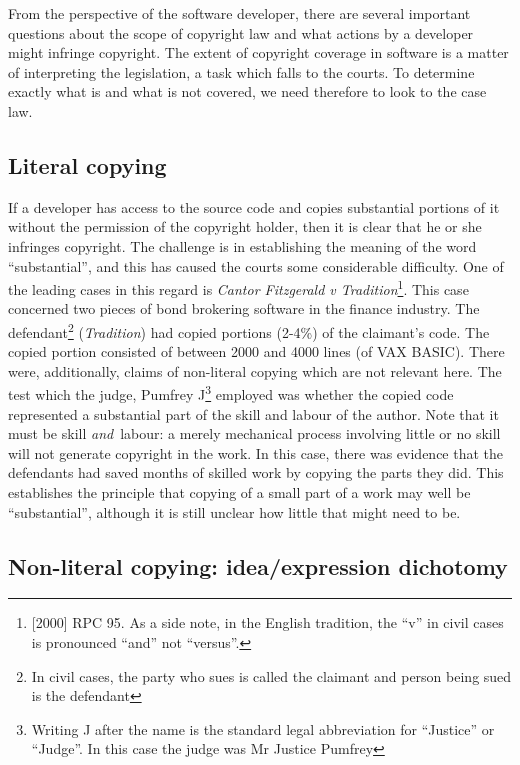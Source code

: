 \documentclass[a4paper,12pt]{article}
\begin{document}
From the perspective of the software developer, there are several important
questions about the scope of copyright law and what actions by a developer
might infringe copyright. The extent of copyright coverage in software is a
matter of interpreting the legislation, a task which falls to the courts. To
determine exactly what is and what is not covered, we need therefore to look
to the case law.

\subsection{Literal copying}

If a developer has access to the source code and copies substantial portions
of it without the permission of the copyright holder, then it is clear that
he or she infringes copyright. The challenge is in establishing the meaning
of the word ``substantial'', and this has caused the courts some
considerable difficulty. One of the leading cases in this regard is
\textit{Cantor Fitzgerald v Tradition}\footnote{[2000] RPC 95. As a side note, in
  the English tradition, the ``v'' in civil cases is pronounced ``and'' not ``versus''.}. This case
concerned two pieces of bond brokering software in the finance industry. The
defendant\footnote{In civil cases, the party who sues is called the claimant
  and person being sued is the defendant} (\textit{Tradition}) had copied portions (2-4\%) of the
claimant's code. The copied portion consisted of between 2000 and 4000 lines
(of VAX BASIC). There were, additionally, claims of non-literal copying
which are not relevant here. The test which the judge, Pumfrey
J\footnote{Writing J after the name is the standard legal abbreviation for
  ``Justice'' or ``Judge''. In this case the judge was Mr Justice Pumfrey}
employed was whether the copied code represented a substantial part of the
skill and labour of the author. Note that it must be skill \emph{and}\
labour: a merely mechanical process involving little or no skill will not
generate copyright in the work. In this case, there was evidence that the defendants had
saved months of skilled work by copying the parts they did. This establishes
the principle that copying of a small part of a work may well be
``substantial'', although it is still unclear how little that might need to be.

\subsection{Non-literal copying: idea/expression dichotomy}
\end{document}
